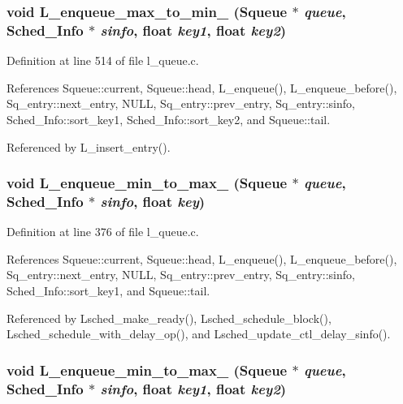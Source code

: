 \subsubsection{\setlength{\rightskip}{0pt plus 5cm}void L\_\-enqueue\_\-max\_\-to\_\-min\_ (\bf{Squeue} $\ast$ {\em queue}, \bf{Sched\_\-Info} $\ast$ {\em sinfo}, float {\em key1}, float {\em key2})}\label{l__queue_8c_33d377c4451e9af0f1ba651643991074}




Definition at line 514 of file l\_\-queue.c.

References Squeue::current, Squeue::head, L\_\-enqueue(), L\_\-enqueue\_\-before(), Sq\_\-entry::next\_\-entry, NULL, Sq\_\-entry::prev\_\-entry, Sq\_\-entry::sinfo, Sched\_\-Info::sort\_\-key1, Sched\_\-Info::sort\_\-key2, and Squeue::tail.

Referenced by L\_\-insert\_\-entry().
\subsubsection{\setlength{\rightskip}{0pt plus 5cm}void L\_\-enqueue\_\-min\_\-to\_\-max\_ (\bf{Squeue} $\ast$ {\em queue}, \bf{Sched\_\-Info} $\ast$ {\em sinfo}, float {\em key})}\label{l__queue_8c_1ac15cca6ba6958e428c64cba5aafb47}




Definition at line 376 of file l\_\-queue.c.

References Squeue::current, Squeue::head, L\_\-enqueue(), L\_\-enqueue\_\-before(), Sq\_\-entry::next\_\-entry, NULL, Sq\_\-entry::prev\_\-entry, Sq\_\-entry::sinfo, Sched\_\-Info::sort\_\-key1, and Squeue::tail.

Referenced by Lsched\_\-make\_\-ready(), Lsched\_\-schedule\_\-block(), Lsched\_\-schedule\_\-with\_\-delay\_\-op(), and Lsched\_\-update\_\-ctl\_\-delay\_\-sinfo().
\subsubsection{\setlength{\rightskip}{0pt plus 5cm}void L\_\-enqueue\_\-min\_\-to\_\-max\_ (\bf{Squeue} $\ast$ {\em queue}, \bf{Sched\_\-Info} $\ast$ {\em sinfo}, float {\em key1}, float {\em key2})}\label{l__queue_8c_fb122397e7ce41f45cb1aa891dd1dc19}




